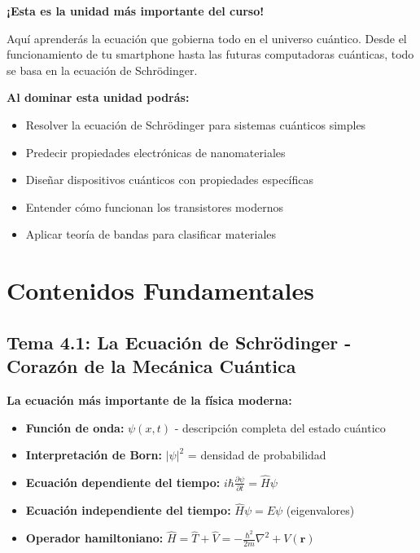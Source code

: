 \begin{notabox}
	\textbf{¡Esta es la unidad más importante del curso!} 
	
	Aquí aprenderás la ecuación que gobierna todo en el universo cuántico. Desde el funcionamiento de tu smartphone hasta las futuras computadoras cuánticas, todo se basa en la ecuación de Schrödinger.
\end{notabox}

\begin{objetivobox}
	\textbf{Al dominar esta unidad podrás:}
	\begin{itemize}
		\item Resolver la ecuación de Schrödinger para sistemas cuánticos simples
		\item Predecir propiedades electrónicas de nanomateriales
		\item Diseñar dispositivos cuánticos con propiedades específicas
		\item Entender cómo funcionan los transistores modernos
		\item Aplicar teoría de bandas para clasificar materiales
	\end{itemize}
\end{objetivobox}

\section{Contenidos Fundamentales}

\subsection{Tema 4.1: La Ecuación de Schrödinger - Corazón de la Mecánica Cuántica}

\begin{saberbox}
	\textbf{La ecuación más importante de la física moderna:}
	\begin{itemize}
		\item \textbf{Función de onda:} $\psi(x,t)$ - descripción completa del estado cuántico
		\item \textbf{Interpretación de Born:} $|\psi|^2$ = densidad de probabilidad
		\item \textbf{Ecuación dependiente del tiempo:} $i\hbar \frac{\partial \psi}{\partial t} = \hat{H}\psi$
		\item \textbf{Ecuación independiente del tiempo:} $\hat{H}\psi = E\psi$ (eigenvalores)
		\item \textbf{Operador hamiltoniano:} $\hat{H} = \hat{T} + \hat{V} = -\frac{\hbar^2}{2m}\nabla^2 + V(\mathbf{r})$
	\end{itemize}
\end{saberbox}

